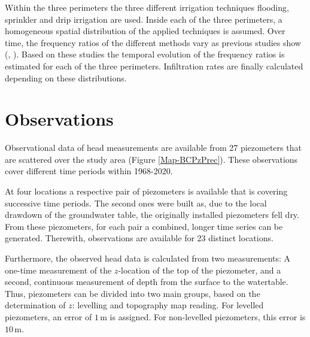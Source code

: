 Within the three perimeters the three different irrigation techniques flooding, sprinkler and drip irrigation are used. 
Inside each of the three perimeters, a homogeneous spatial distribution of the applied techniques is assumed. 
Over time, the frequency ratios of the different methods vary as previous studies show (\cite{Resing.2003}, \cite{Anzar.2016}). 
Based on these studies the temporal evolution of the frequency ratios is estimated for each of the three perimeters. 
Infiltration rates are finally calculated depending on these distributions.



\section{Observations}
\label{Sec-Piezometers}

Observational data of head measurements are available from 27 piezometers that are scattered over the study area (Figure \ref{Map-BCPzPrec}). 
These observations cover different time periods within 1968-2020.


At four locations a respective pair of piezometers is available that is covering successive time periods. 
The second ones were built as, due to the local drawdown of the groundwater table, the originally installed piezometers fell dry. 
From these piezometers, for each pair a combined, longer time series can be generated. 
Therewith, observations are available for 23 distinct locations.

Furthermore, the observed head data is calculated from two measurements: A one-time measurement of the $z$-location of the top of the piezometer, and a second, continuous measurement of depth from the surface to the watertable. 
Thus, piezometers can be divided into two main groups, based on the determination of $z$: levelling and topography map reading. 
For levelled piezometers, an error of $1 \, \textrm{m}$ is assigned. 
For non-levelled piezometers, this error is $10 \, \textrm{m}$.

